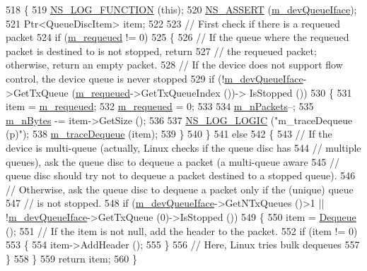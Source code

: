 \begin{DoxyCode}
518 \{
519   \hyperlink{log-macros-disabled_8h_a90b90d5bad1f39cb1b64923ea94c0761}{NS\_LOG\_FUNCTION} (\textcolor{keyword}{this});
520   \hyperlink{assert_8h_a6dccdb0de9b252f60088ce281c49d052}{NS\_ASSERT} (\hyperlink{classns3_1_1QueueDisc_a265febf26e8325dbb3ba1f905ea1912d}{m\_devQueueIface});
521   Ptr<QueueDiscItem> item;
522 
523   \textcolor{comment}{// First check if there is a requeued packet}
524   \textcolor{keywordflow}{if} (\hyperlink{classns3_1_1QueueDisc_a43cae3d282e28914b1b5e1b782c7e854}{m\_requeued} != 0)
525     \{
526         \textcolor{comment}{// If the queue where the requeued packet is destined to is not stopped, return}
527         \textcolor{comment}{// the requeued packet; otherwise, return an empty packet.}
528         \textcolor{comment}{// If the device does not support flow control, the device queue is never stopped}
529         \textcolor{keywordflow}{if} (!\hyperlink{classns3_1_1QueueDisc_a265febf26e8325dbb3ba1f905ea1912d}{m\_devQueueIface}->GetTxQueue (\hyperlink{classns3_1_1QueueDisc_a43cae3d282e28914b1b5e1b782c7e854}{m\_requeued}->GetTxQueueIndex ())->
      IsStopped ())
530           \{
531             item = \hyperlink{classns3_1_1QueueDisc_a43cae3d282e28914b1b5e1b782c7e854}{m\_requeued};
532             \hyperlink{classns3_1_1QueueDisc_a43cae3d282e28914b1b5e1b782c7e854}{m\_requeued} = 0;
533 
534             \hyperlink{classns3_1_1QueueDisc_a7afc9edf0fdb517d088ebe8d3747fbef}{m\_nPackets}--;
535             \hyperlink{classns3_1_1QueueDisc_a5c9e0e5c858f333bb15089eea58a1e3b}{m\_nBytes} -= item->GetSize ();
536 
537             \hyperlink{group__logging_ga88acd260151caf2db9c0fc84997f45ce}{NS\_LOG\_LOGIC} (\textcolor{stringliteral}{"m\_traceDequeue (p)"});
538             \hyperlink{classns3_1_1QueueDisc_a1be3a308037b0feb28ae284b9be04bfc}{m\_traceDequeue} (item);
539           \}
540     \}
541   \textcolor{keywordflow}{else}
542     \{
543       \textcolor{comment}{// If the device is multi-queue (actually, Linux checks if the queue disc has}
544       \textcolor{comment}{// multiple queues), ask the queue disc to dequeue a packet (a multi-queue aware}
545       \textcolor{comment}{// queue disc should try not to dequeue a packet destined to a stopped queue).}
546       \textcolor{comment}{// Otherwise, ask the queue disc to dequeue a packet only if the (unique) queue}
547       \textcolor{comment}{// is not stopped.}
548       \textcolor{keywordflow}{if} (\hyperlink{classns3_1_1QueueDisc_a265febf26e8325dbb3ba1f905ea1912d}{m\_devQueueIface}->GetNTxQueues ()>1 || !\hyperlink{classns3_1_1QueueDisc_a265febf26e8325dbb3ba1f905ea1912d}{m\_devQueueIface}->GetTxQueue 
      (0)->IsStopped ())
549         \{
550           item = \hyperlink{classns3_1_1QueueDisc_a6c13fc489822c1487f61c2289f2e3629}{Dequeue} ();
551           \textcolor{comment}{// If the item is not null, add the header to the packet.}
552           \textcolor{keywordflow}{if} (item != 0)
553             \{
554               item->AddHeader ();
555             \}
556           \textcolor{comment}{// Here, Linux tries bulk dequeues}
557         \}
558     \}
559   \textcolor{keywordflow}{return} item;
560 \}
\end{DoxyCode}


